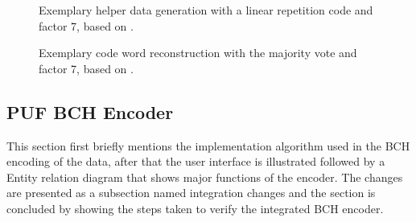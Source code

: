 \begin{figure}[h]
\centering
{}
\caption{Exemplary helper data generation with a linear repetition code and factor 7, based on \cite{10}.}
\label{img:4_LR_HD}
\end{figure}

\begin{figure}[h]
\centering
{}
\caption{Exemplary code word reconstruction with the majority vote and factor 7, based on \cite{10}.}
\label{img:4_MV_codewords}
\end{figure}

\subsection{PUF BCH Encoder}
This section first briefly mentions the implementation algorithm used in the BCH encoding of the data, after that the user interface is illustrated followed by a Entity relation diagram that shows major functions of the encoder. The changes are presented as a subsection named integration changes and the section is concluded by showing the steps taken to verify the integrated BCH encoder.\\

